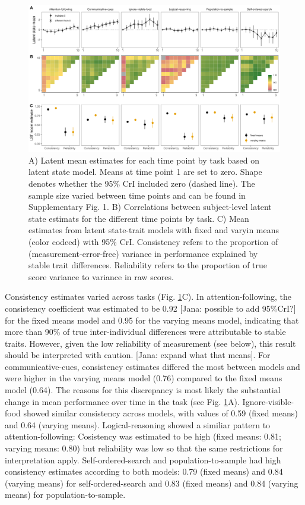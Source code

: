 \documentclass[
  man,floatsintext]{apa6}
\begin{document}
\begin{figure}

{\centering \includegraphics[width=1\linewidth]{../visuals/ls_lst} 

}

\caption{A) Latent mean estimates for each time point by task based on latent state model. Means at time point 1 are set to zero. Shape denotes whether the 95\% CrI included zero (dashed line). The sample size varied between time points and can be found in Supplementary Fig. 1.  B) Correlations between subject-level latent state estimats for the different time points by task. C) Mean estimates from latent state-trait models with fixed and varyin means (color codeed) with 95\% CrI. Consistency refers to the proportion of (measurement-error-free) variance in performance explained by stable trait differences. Reliability refers to the proportion of true score variance to variance in raw scores.}\label{fig:figsem}
\end{figure}

Consistency estimates varied across tasks (Fig. \ref{fig:figsem}C). In attention-following, the consistency coefficient was estimated to be 0.92 {[}Jana: possible to add 95\%CrI?{]} for the fixed means model and 0.95 for the varying means model, indicating that more than 90\% of true inter-individual differences were attributable to stable traits. However, given the low reliability of measurement (see below), this result should be interpreted with caution. {[}Jana: expand what that means{]}. For communicative-cues, consistency estimates differed the most between models and were higher in the varying means model (0.76) compared to the fixed means model (0.64). The reasons for this discrepancy is most likely the substantial change in mean performance over time in the task (see Fig. \ref{fig:figsem}A). Ignore-visible-food showed similar consistency across models, with values of 0.59 (fixed means) and 0.64 (varying means). Logical-reasoning showed a similiar pattern to attention-following: Cosistency was estimated to be high (fixed means: 0.81; varying means: 0.80) but reliability was low so that the same restrictions for interpretation apply. Self-ordered-search and population-to-sample had high consistency estimates according to both models: 0.79 (fixed means) and 0.84 (varying means) for self-ordered-search and 0.83 (fixed means) and 0.84 (varying means) for population-to-sample.
\end{document}
